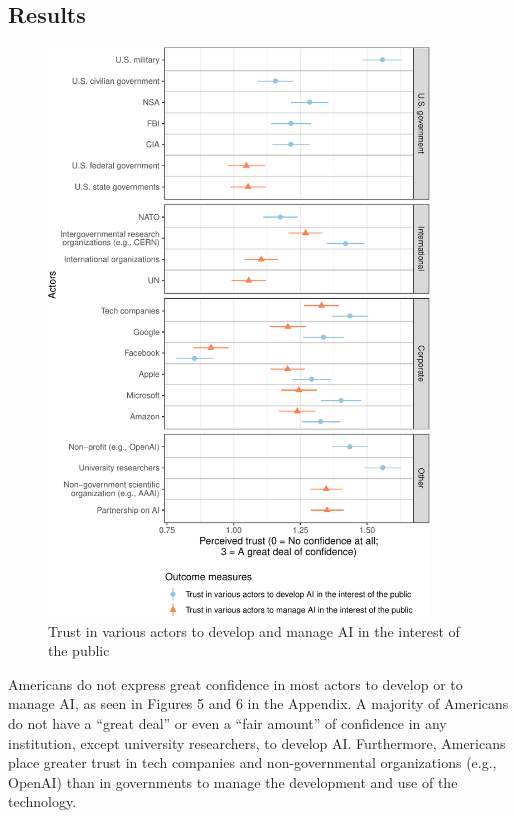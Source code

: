 \documentclass{article}
\begin{document}
\subsection{Results}

\begin{figure}
\centering
\includegraphics[width=0.90\textwidth]{images/trustcoef-1.pdf}
\caption{Trust in various actors to develop and manage AI in the interest of the public}
\label{fig:trust}
\end{figure}

Americans do not express great confidence in most actors to develop or to manage AI, as seen in Figures 5 and 6 in the Appendix. A majority of Americans do not have a ``great deal'' or even a ``fair amount'' of confidence in any institution, except university researchers, to develop AI. Furthermore, Americans place greater trust in tech companies and non-governmental organizations (e.g., OpenAI) than in governments to manage the development and use of the technology.
\end{document}

